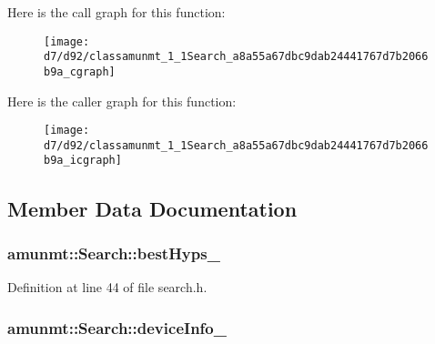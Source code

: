 Here is the call graph for this function\+:
\nopagebreak
\begin{figure}[H]
\begin{center}
\leavevmode
\texttt{[image: d7/d92/classamunmt\_1\_1Search\_a8a55a67dbc9dab24441767d7b2066b9a\_cgraph]}
\end{center}
\end{figure}




Here is the caller graph for this function\+:
\nopagebreak
\begin{figure}[H]
\begin{center}
\leavevmode
\texttt{[image: d7/d92/classamunmt\_1\_1Search\_a8a55a67dbc9dab24441767d7b2066b9a\_icgraph]}
\end{center}
\end{figure}




\subsection{Member Data Documentation}
\subsubsection[{\texorpdfstring{best\+Hyps\+\_\+}{bestHyps_}}]{ amunmt\+::\+Search\+::best\+Hyps\+\_\+\hspace{0.3cm}{\ttfamily [protected]}}\hypertarget{classamunmt_1_1Search_a1454a9ba53f206b38f21111b9ad67bc3}{}\label{classamunmt_1_1Search_a1454a9ba53f206b38f21111b9ad67bc3}


Definition at line 44 of file search.\+h.

\subsubsection[{\texorpdfstring{device\+Info\+\_\+}{deviceInfo_}}]{ amunmt\+::\+Search\+::device\+Info\+\_\+\hspace{0.3cm}{\ttfamily [protected]}}\hypertarget{classamunmt_1_1Search_ad382dcf0a7fb1d22b4150e19f46941c6}{}\label{classamunmt_1_1Search_ad382dcf0a7fb1d22b4150e19f46941c6}


